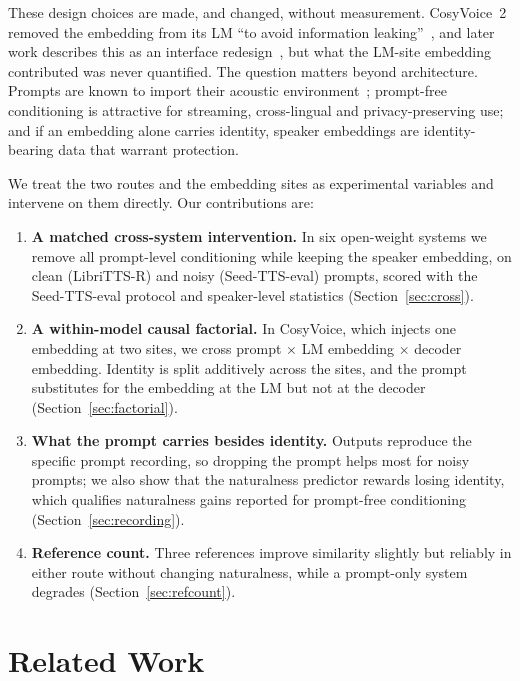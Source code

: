 \documentclass[10pt]{article}
\begin{document}
These design choices are made, and changed, without measurement.
CosyVoice~2 removed the embedding from its LM ``to avoid information leaking''~\citep{cosyvoice2}, and later work describes this as an interface redesign~\citep{chen2026bottleneck}, but what the LM-site embedding contributed was never quantified.
The question matters beyond architecture.
Prompts are known to import their acoustic environment~\citep{lu2025noise,wang2024noise}; prompt-free conditioning is attractive for streaming, cross-lingual and privacy-preserving use; and if an embedding alone carries identity, speaker embeddings are identity-bearing data that warrant protection.

We treat the two routes and the embedding sites as experimental variables and intervene on them directly.
Our contributions are:
\begin{enumerate}
  \item \textbf{A matched cross-system intervention.} In six open-weight systems we remove all prompt-level conditioning while keeping the speaker embedding, on clean (LibriTTS-R) and noisy (Seed-TTS-eval) prompts, scored with the Seed-TTS-eval protocol and speaker-level statistics (Section~\ref{sec:cross}).
  \item \textbf{A within-model causal factorial.} In CosyVoice, which injects one embedding at two sites, we cross prompt $\times$ LM embedding $\times$ decoder embedding. Identity is split additively across the sites, and the prompt substitutes for the embedding at the LM but not at the decoder (Section~\ref{sec:factorial}).
  \item \textbf{What the prompt carries besides identity.} Outputs reproduce the specific prompt recording, so dropping the prompt helps most for noisy prompts; we also show that the naturalness predictor rewards losing identity, which qualifies naturalness gains reported for prompt-free conditioning (Section~\ref{sec:recording}).
  \item \textbf{Reference count.} Three references improve similarity slightly but reliably in either route without changing naturalness, while a prompt-only system degrades (Section~\ref{sec:refcount}).
\end{enumerate}

\section{Related Work}
\label{sec:related}
\end{document}
